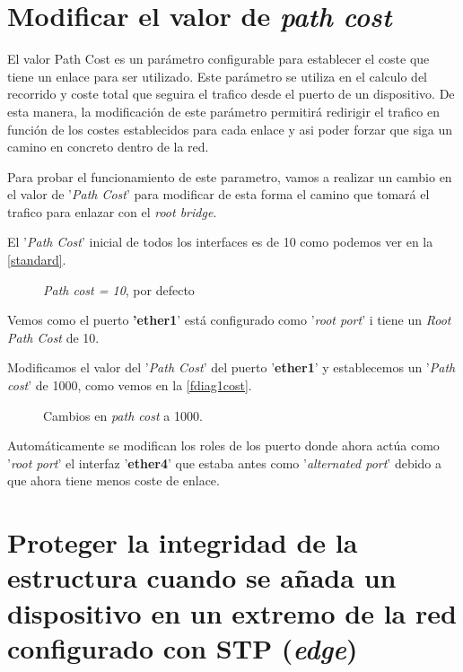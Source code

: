 \section{Modificar el valor de \textit{path cost}}

El valor Path Cost es un parámetro configurable para establecer el coste que tiene un enlace para ser utilizado. Este parámetro se utiliza en el calculo del recorrido y coste total que seguira el trafico desde el puerto de un dispositivo. De esta manera, la modificación de este parámetro permitirá redirigir el trafico en función de los costes establecidos para cada enlace y asi poder forzar que siga un camino en concreto dentro de la red.

Para probar el funcionamiento de este parametro, vamos a realizar un cambio en el valor de '\textit{Path Cost}' para modificar de esta forma el camino que tomará el trafico para enlazar con el \textit{root bridge}.

El '\textit{Path Cost}' inicial de todos los interfaces es de 10 como podemos ver en la \autoref{standard}.


\begin{figure}[h!]\centering
	\caption{\textit{Path cost = 10}, por defecto}
	\label{standard}
	\bigskip
\end{figure}

Vemos como el puerto \textbf{'ether1}' está configurado como '\textit{root port}' i tiene un \textit{Root Path Cost} de 10.

Modificamos el valor del '\textit{Path Cost}' del puerto '\textbf{ether1}' y establecemos un '\textit{Path cost}' de 1000, como vemos en la \autoref{fdiag1cost}.

\begin{figure}[h!]\centering
	\caption{Cambios en \textit{path cost} a 1000.}
	\label{fdiag1cost}
	\bigskip
\end{figure}

Automáticamente se modifican los roles de los puerto donde ahora actúa como '\textit{root port}' el interfaz '\textbf{ether4}' que estaba antes como '\textit{alternated port}' debido a que ahora tiene menos coste de enlace.

\section{Proteger la integridad de la estructura cuando se añada un dispositivo en un extremo de la red configurado con STP (\textit{edge})}
\label{edge5}


